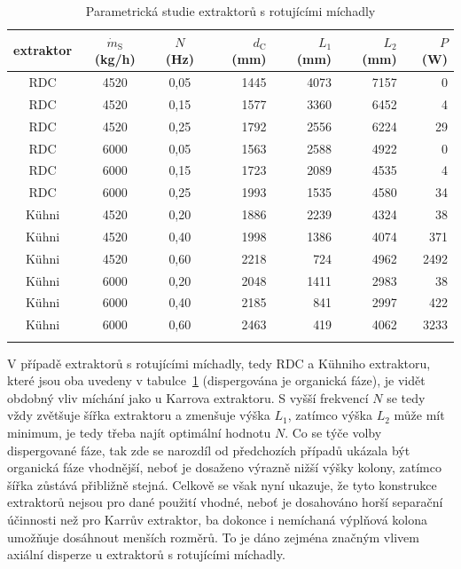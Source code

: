 \begin{table}[ht]
\caption{Parametrická studie extraktorů s rotujícími míchadly} \label{tab:calltableRotDisc}
\begin{center}
\begin{tabular}{ccc|rrrr}
	\Xhline{2pt}
	extraktor & $\dot{m}_\mathrm{S}$ (kg/h) & $N$ (Hz) & $d_\mathrm{C}$ (mm) & $L_1$ (mm) & $L_2$ (mm) & $P$ (W) \\ \hline
	RDC   & 4520 & 0,05 & 1445 & 4073 & 7157 & 0  \\
	RDC   & 4520 & 0,15 & 1577 & 3360 & 6452 & 4  \\
	RDC   & 4520 & 0,25 & 1792 & 2556 & 6224 & 29 \\
	RDC   & 6000 & 0,05 & 1563 & 2588 & 4922 & 0  \\
	RDC   & 6000 & 0,15 & 1723 & 2089 & 4535 & 4  \\
	RDC   & 6000 & 0,25 & 1993 & 1535 & 4580 & 34 \\ \hline
	Kühni & 4520 & 0,20 & 1886 & 2239 & 4324 & 38   \\
	Kühni & 4520 & 0,40 & 1998 & 1386 & 4074 & 371  \\
	Kühni & 4520 & 0,60 & 2218 &  724 & 4962 & 2492 \\
	Kühni & 6000 & 0,20 & 2048 & 1411 & 2983 & 38   \\
	Kühni & 6000 & 0,40 & 2185 &  841 & 2997 & 422  \\
	Kühni & 6000 & 0,60 & 2463 &  419 & 4062 & 3233 \\
	\Xhline{2pt}
\end{tabular}
\end{center}
\end{table}
V případě extraktorů s rotujícími míchadly, tedy RDC a Kühniho extraktoru, které jsou oba uvedeny v tabulce~\ref{tab:calltableRotDisc} (dispergována je organická fáze), je vidět obdobný vliv míchání jako u Karrova extraktoru.
S vyšší frekvencí $N$ se tedy vždy zvětšuje šířka extraktoru a zmenšuje výška $L_1$, zatímco výška $L_2$ může mít minimum, je tedy třeba najít optimální hodnotu $N$.
Co se týče volby dispergované fáze, tak zde se narozdíl od předchozích případů ukázala být organická fáze vhodnější, neboť je dosaženo výrazně nižší výšky kolony, zatímco šířka zůstává přibližně stejná.
Celkově se však nyní ukazuje, že tyto konstrukce extraktorů nejsou pro dané použití vhodné, neboť je dosahováno horší separační účinnosti než pro Karrův extraktor, ba dokonce i nemíchaná výplňová kolona umožňuje dosáhnout menších rozměrů.
To je dáno zejména značným vlivem axiální disperze u extraktorů s rotujícími míchadly.

